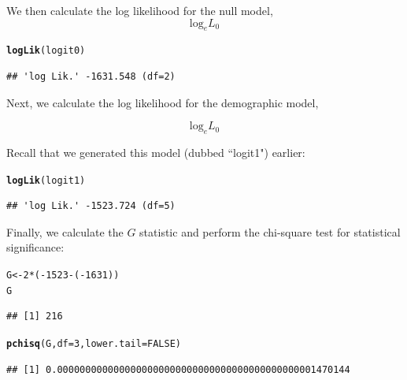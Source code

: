 \documentclass[11pt,openany]{book}\usepackage[]{graphicx}\usepackage[]{color}
\makeatletter
\newcommand{\hlnum}[1]{\textcolor[rgb]{0.686,0.059,0.569}{#1}}%
\newcommand{\hlopt}[1]{\textcolor[rgb]{0,0,0}{#1}}%
\newcommand{\hlstd}[1]{\textcolor[rgb]{0.345,0.345,0.345}{#1}}%
\newcommand{\hlkwb}[1]{\textcolor[rgb]{0.69,0.353,0.396}{#1}}%
\newcommand{\hlkwc}[1]{\textcolor[rgb]{0.333,0.667,0.333}{#1}}%
\newcommand{\hlkwd}[1]{\textcolor[rgb]{0.737,0.353,0.396}{\textbf{#1}}}%
\newenvironment{kframe}{%
 \def\at@end@of@kframe{}%
 \ifinner\ifhmode%
  \def\at@end@of@kframe{\end{minipage}}%
  \begin{minipage}{\columnwidth}%
 \fi\fi%
 \def\FrameCommand##1{\hskip\@totalleftmargin \hskip-\fboxsep
 \colorbox{shadecolor}{##1}\hskip-\fboxsep
     \hskip-\linewidth \hskip-\@totalleftmargin \hskip\columnwidth}%
 \MakeFramed {\advance\hsize-\width
   \@totalleftmargin\z@ \linewidth\hsize
   \@setminipage}}%
 {\par\unskip\endMakeFramed%
 \at@end@of@kframe}
\newenvironment{knitrout}{}{} %
\renewenvironment{knitrout}{\begin{singlespace}}{\end{singlespace}} %
\makeatother
\begin{document}
We then calculate the log likelihood for the null model, 
\begin{equation}\text{log}_e L_0\end{equation}

\begin{knitrout}
\color{fgcolor}\begin{kframe}
\begin{alltt}
\hlkwd{logLik}\hlstd{(logit0)}
\end{alltt}
\begin{verbatim}
## 'log Lik.' -1631.548 (df=2)
\end{verbatim}
\end{kframe}
\end{knitrout}

Next, we calculate the log likelihood for the demographic model, 

\begin{equation}\text{log}_e L_0\end{equation}

Recall that we generated this model (dubbed ``logit1") earlier:

\begin{knitrout}
\color{fgcolor}\begin{kframe}
\begin{alltt}
\hlkwd{logLik}\hlstd{(logit1)}
\end{alltt}
\begin{verbatim}
## 'log Lik.' -1523.724 (df=5)
\end{verbatim}
\end{kframe}
\end{knitrout}

Finally, we calculate the  $G$ statistic and perform the chi-square test for statistical significance:

\begin{knitrout}
\color{fgcolor}\begin{kframe}
\begin{alltt}
\hlstd{G} \hlkwb{<-} \hlnum{2} \hlopt{*} \hlstd{(}\hlopt{-}\hlnum{1523} \hlopt{-} \hlstd{(}\hlopt{-}\hlnum{1631}\hlstd{))}
\hlstd{G}
\end{alltt}
\begin{verbatim}
## [1] 216
\end{verbatim}
\begin{alltt}
\hlkwd{pchisq}\hlstd{(G,} \hlkwc{df} \hlstd{=} \hlnum{3}\hlstd{,} \hlkwc{lower.tail} \hlstd{=} \hlnum{FALSE}\hlstd{)}
\end{alltt}
\begin{verbatim}
## [1] 0.0000000000000000000000000000000000000000000001470144
\end{verbatim}
\end{kframe}
\end{knitrout}
\end{document}
